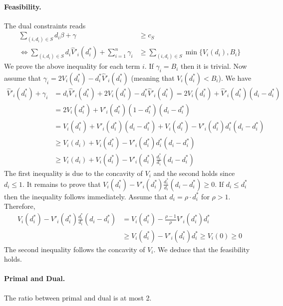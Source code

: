 \documentclass[11pt,a4paper]{article}
\begin{document}
\paragraph{Feasibility.}
The dual constraints reads
\begin{align*}
\sum_{(i,d_{i}) \in S} d_{i} \beta + \gamma &\geq c_{S} \\
%
\Leftrightarrow
\sum_{(i,d_{i}) \in S} d_{i} \hat{V}'_{i}(d^{*}_{i})  + \sum_{i=1}^{n} \gamma_{i} &\geq \sum_{(i,d_{i}) \in S} \min\{V_{i}(d_{i}), B_{i}\}
\end{align*}
%
We prove the above inequality for each term $i$. If $\gamma_{i} = B_{i}$ then it is trivial. Now assume that
$\gamma_{i} = 2 V_{i}(d^{*}_{i}) -   d^{*}_{i} \hat{V}'_{i}(d^{*}_{i})$ (meaning that $V_{i}(d^{*}_{i}) < B_{i}$).
We have
%
\begin{align*}
\hat{V}'_{i}(d^{*}_{i})  + \gamma_{i}
&= d_{i} \hat{V}'_{i}(d^{*}_{i})  + 2 V_{i}(d^{*}_{i}) -   d^{*}_{i} \hat{V}'_{i}(d^{*}_{i})
= 2 V_{i}(d^{*}_{i}) + \hat{V}'_{i}(d^{*}_{i}) (d_{i} - d^{*}_{i}) \\
%
&= 2 V_{i}(d^{*}_{i}) + V'_{i}(d^{*}_{i})(1 - d^{*}_{i}) (d_{i} - d^{*}_{i}) \\
%
&= V_{i}(d^{*}_{i}) + V'_{i}(d^{*}_{i})(d_{i} - d^{*}_{i}) + V_{i}(d^{*}_{i})  - V'_{i}(d^{*}_{i}) d^{*}_{i} (d_{i} - d^{*}_{i}) \\
%
&\geq V_{i}(d_{i}) + V_{i}(d^{*}_{i})  - V'_{i}(d^{*}_{i}) d^{*}_{i} (d_{i} - d^{*}_{i}) \\
%
&\geq V_{i}(d_{i}) + V_{i}(d^{*}_{i})  - V'_{i}(d^{*}_{i}) \frac{d^{*}_{i}}{d_{i}} (d_{i} - d^{*}_{i})
\end{align*}
The first inequality is due to the concavity of $V_{i}$ and the second holds since $d_{i} \leq 1$.
It remains to prove that $V_{i}(d^{*}_{i})  - V'_{i}(d^{*}_{i}) \frac{d^{*}_{i}}{d_{i}} (d_{i} - d^{*}_{i}) \geq 0$.
If $d_{i} \leq d^{*}_{i}$ then the inequality follows immediately. Assume that $d_{i} = \rho \cdot d^{*}_{i}$ for $\rho > 1$.
Therefore,
\begin{align*}
V_{i}(d^{*}_{i})  - V'_{i}(d^{*}_{i}) \frac{d^{*}_{i}}{d_{i}} (d_{i} - d^{*}_{i})
&= V_{i}(d^{*}_{i})  - \frac{\rho - 1}{\rho} V'_{i}(d^{*}_{i}) d^{*}_{i} \\
%
&\geq V_{i}(d^{*}_{i})  - V'_{i}(d^{*}_{i}) d^{*}_{i} \geq V_{i}(0) \geq 0
\end{align*}
The second inequality follows the concavity of $V_{i}$. We deduce that the feasibility holds.

\paragraph{Primal and Dual.}
The ratio between primal and dual is at most 2.
\end{document}

